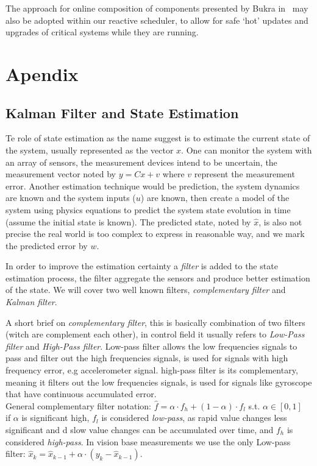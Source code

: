 \documentclass[ twoside, 12pt ]{article}
\begin{document}
The approach for online composition of components presented by Bukra in~\cite{Merav} may also be adopted within our reactive scheduler, to allow for safe `hot' updates and upgrades of critical systems while they are running. 

\section{Apendix}
\subsection{Kalman Filter and State Estimation}
\label{sec:kalman}
Te role of state estimation as the name suggest is to estimate the current state of the system, usually represented as the vector $x$.
One can monitor the system with an array of sensors, the measurement devices intend to be uncertain, the measurement vector noted by $y=Cx+v$ where $v$ represent the measurement error.
Another estimation technique would be prediction, the system dynamics are known and the system inputs ($u$) are known, then create a model of the system using physics equations to predict the system state evolution in time (assume the initial state is known).
The predicted state, noted by $\hat{x}$, is also not precise the real world is too complex to express in reasonable way, and we mark the predicted error by $w$.

In order to improve the estimation certainty a \textit{filter} is added to the state estimation process, the filter aggregate the sensors and produce better estimation of the state.
We will cover two well known filters, \textit{complementary filter} and \textit{Kalman filter}.

A short brief on \textit{complementary filter}, this is basically combination of two filters (witch are complement each other), in control field it usually refers to \textit{Low-Pass filter} and \textit{High-Pass filter}.
Low-pass filter allows the low frequencies signals to pass and filter out the high frequencies signals, is used for signals with high frequency error, e.g accelerometer signal.
high-pass filter is its complementary, meaning it filters out the low frequencies signals, is used for signals like gyroscope that have continuous accumulated error.
\\General complementary filter notation: $\hat{f} = \alpha \cdot f_h + (1-\alpha) \cdot f_l$ s.t. $\alpha \in [0,1]$
\\if $\alpha$ is significant high, $f_l$ is considered \textit{low-pass}, as rapid value changes less significant and d slow value changes can be accumulated over time, and $f_h$ is considered \textit{high-pass}.
In vision base measurements we use the only Low-pass filter:
$ \hat{x}_k = \hat{x}_{k-1} + \alpha \cdot (y_k - \hat{x}_{k-1}) $.
\end{document}

